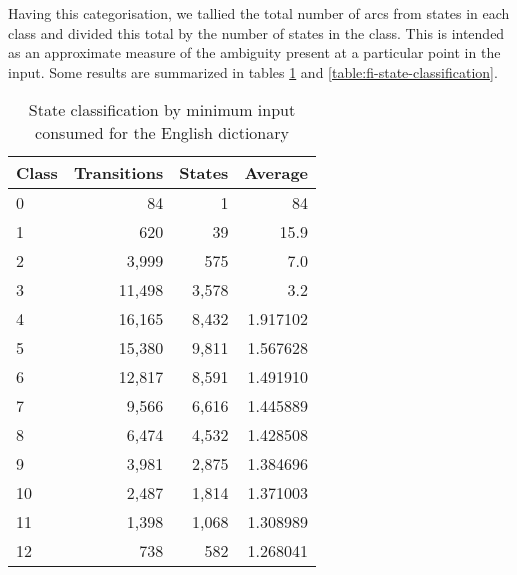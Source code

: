 \documentclass[11pt]{article}
\begin{document}
Having this categorisation, we tallied the total number of arcs from states in
each class and divided this total by the number of states in the class. This
is intended as an approximate measure of the ambiguity present at a particular
point in the input. Some results are summarized in tables
\ref{table:en-state-classification} and \ref{table:fi-state-classification}.

\begin{table}[h]
\begin{center}
\begin{scriptsize}
\begin{tabular}{|l|rrr|}
\hline
\bf Class & \bf Transitions & \bf States & \bf Average \\ 
\hline
0 & 84 & 1 & 84 \\
1 & 620 & 39 & 15.9 \\
2 & 3,999 & 575 & 7.0 \\
3 & 11,498 & 3,578 & 3.2 \\
4 & 16,165 & 8,432 & 1.917102 \\
5 & 15,380 & 9,811 & 1.567628 \\
6 & 12,817 & 8,591 & 1.491910 \\
7 & 9,566 & 6,616 & 1.445889 \\
8 & 6,474 & 4,532 & 1.428508 \\
9 & 3,981 & 2,875 & 1.384696 \\
10 & 2,487 & 1,814 & 1.371003 \\
11 & 1,398 & 1,068 & 1.308989 \\
12 & 738 & 582 & 1.268041 \\
\hline
\end{tabular}
\end{scriptsize}
\end{center}
\caption{\label{table:en-state-classification}
State classification by minimum input consumed for the English dictionary}
\end{table}
\end{document}
